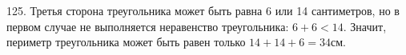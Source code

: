 125. Третья сторона треугольника может быть равна 6 или 14 сантиметров, но в первом случае не выполняется неравенство треугольника: $6+6<14.$ Значит, периметр треугольника может быть равен только $14+14+6=34$см.\\
